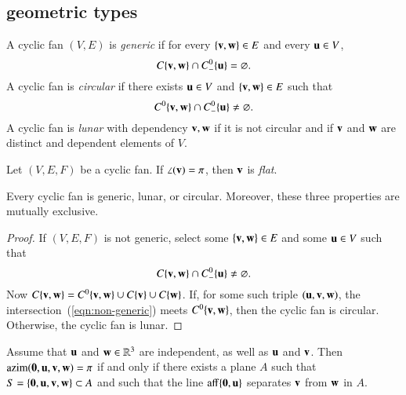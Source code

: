 \subsection{geometric types}\label{sec:types}

\begin{definition}
A cyclic fan $(V,E)$ is {\it generic} if for every $\{{\mathbf v},{\mathbf w}\}\in E$
and every ${\mathbf u}\in V$, 
$$
C\{{\mathbf v},{\mathbf w}\}\cap C^0_-\{{\mathbf u}\} = \varnothing.
$$
A cyclic fan is {\it circular} if there exists ${\mathbf u}\in V$ and $\{{\mathbf v},{\mathbf w}\}\in E$ such that 
$$
C^0\{{\mathbf v},{\mathbf w}\}\cap C^0_-\{{\mathbf u}\}\ne \varnothing.
$$
A cyclic fan is {\it lunar} with dependency ${\mathbf v},{\mathbf w}$ if it is not circular and if ${\mathbf v}$ and ${\mathbf w}$ are distinct and dependent elements of $V$.
\end{definition}
%
%
%

\begin{definition} Let $(V,E,F)$ be a cyclic fan.
If $\angle({\mathbf v})=\pi$, then ${\mathbf v}$ is {\it flat}.
\end{definition}


\begin{lemma} Every cyclic fan is
generic, lunar, or circular.  Moreover, these three properties are mutually exclusive.
\end{lemma}
%
%
%
%
%

\begin{proof} If $(V,E,F)$ is not generic,  select some $\{{\mathbf v},{\mathbf w}\}\in E$
and some ${\mathbf u}\in V$ such that
\begin{equation}\label{eqn:non-generic}
C\{{\mathbf v},{\mathbf w}\}\cap C^0_-\{{\mathbf u}\} \ne \varnothing.
\end{equation}
Now $C\{{\mathbf v},{\mathbf w}\} = C^0\{{\mathbf v},{\mathbf w}\} \cup C\{{\mathbf v}\}\cup C\{{\mathbf w}\}$.  
If, for some such triple $({\mathbf u},{\mathbf v},{\mathbf w})$, the intersection~(\ref{eqn:non-generic}) meets $C^0\{{\mathbf v},{\mathbf w}\}$, then the cyclic fan is circular.  
Otherwise, the cyclic fan is lunar. 
\end{proof}

\begin{lemma}  \label{lemma:coplanar}
Assume that ${\mathbf u}$ and ${\mathbf w}\in\mathbb{R}^3$ are independent, as well as ${\mathbf u}$ and ${\mathbf v}$.  Then ${\operatorname{azim}}({\mathbf 0},{\mathbf u},{\mathbf v},{\mathbf w})=\pi$
if and only if there exists a plane $A$ such that
$S=\{{\mathbf 0},{\mathbf u},{\mathbf v},{\mathbf w}\}\subset A$ and such that the line ${\operatorname{aff}}\{{\mathbf 0},{\mathbf u}\}$ separates ${\mathbf v}$ from ${\mathbf w}$ in $A$.
\end{lemma}

